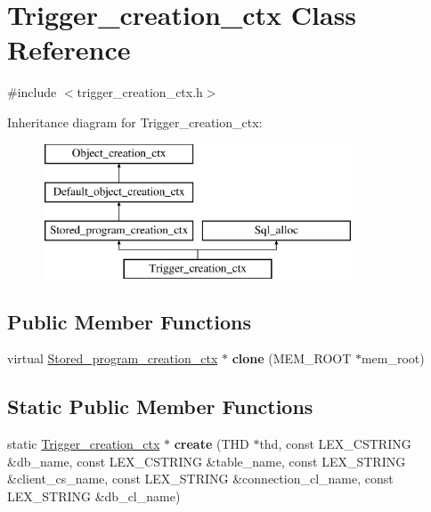 \hypertarget{classTrigger__creation__ctx}{}\section{Trigger\+\_\+creation\+\_\+ctx Class Reference}
\label{classTrigger__creation__ctx}


{\ttfamily \#include $<$trigger\+\_\+creation\+\_\+ctx.\+h$>$}

Inheritance diagram for Trigger\+\_\+creation\+\_\+ctx\+:\begin{figure}[H]
\begin{center}
\leavevmode
\includegraphics[height=4.000000cm]{classTrigger__creation__ctx}
\end{center}
\end{figure}
\subsection*{Public Member Functions}
\begin{DoxyCompactItemize}
\item 
\mbox{\label{classTrigger__creation__ctx_a200d21f61ae822a204f33ec61ce7cdbd}} 
virtual \mbox{\hyperlink{classStored__program__creation__ctx}{Stored\+\_\+program\+\_\+creation\+\_\+ctx}} $\ast$ {\bfseries clone} (M\+E\+M\+\_\+\+R\+O\+OT $\ast$mem\+\_\+root)
\end{DoxyCompactItemize}
\subsection*{Static Public Member Functions}
\begin{DoxyCompactItemize}
\item 
\mbox{\label{classTrigger__creation__ctx_a74cc0c7280482385eccb8aae2bfb8a37}} 
static \mbox{\hyperlink{classTrigger__creation__ctx}{Trigger\+\_\+creation\+\_\+ctx}} $\ast$ {\bfseries create} (T\+HD $\ast$thd, const L\+E\+X\+\_\+\+C\+S\+T\+R\+I\+NG \&db\+\_\+name, const L\+E\+X\+\_\+\+C\+S\+T\+R\+I\+NG \&table\+\_\+name, const L\+E\+X\+\_\+\+S\+T\+R\+I\+NG \&client\+\_\+cs\+\_\+name, const L\+E\+X\+\_\+\+S\+T\+R\+I\+NG \&connection\+\_\+cl\+\_\+name, const L\+E\+X\+\_\+\+S\+T\+R\+I\+NG \&db\+\_\+cl\+\_\+name)
\end{DoxyCompactItemize}
